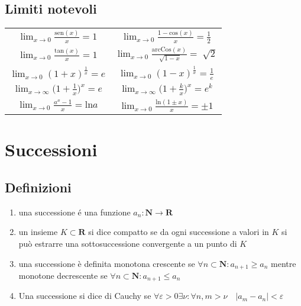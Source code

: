 \documentclass{exam}
\begin{document}
  \subsection{Limiti notevoli}
    \begin{center}
      \begin{tabular}{|c|c|}
        \(\displaystyle \lim_{x\to 0}\frac{\textrm{sen}(x)}{x}=1\)&
        \(\displaystyle \lim_{x\to 0}\frac{1-\textrm{cos}(x)}{x}=\frac{1}{2}\)\\
        \(\displaystyle \lim_{x\to 0}\frac{\textrm{tan}(x)}{x}=1\)&
        \(\displaystyle \lim_{x\to 0}\frac{\textrm{arcCos}(x)}{\sqrt[]{1-x}}=\sqrt[]{2}\)\\
        \(\displaystyle \lim_{x\to 0}(1+x)^\frac{1}{x}=e\)&
        \(\displaystyle \lim_{x\to 0}(1-x)^\frac{1}{x}=\frac{1}{e}\)\\
        \(\displaystyle \lim_{x\to \infty}\Big(1+\frac{1}{x}\Big)^x=e\)&
        \(\displaystyle \lim_{x\to \infty}\Big(1+\frac{k}{x}\Big)^x=e^k\)\\
        \(\displaystyle \lim_{x\to 0}\frac{a^x-1}{x}=\textrm{ln}{a}\)&
        \(\displaystyle \lim_{x\to 0}\frac{\textrm{ln}(1\pm x)}{x}=\pm 1\)\\
      \end{tabular}
    \end{center}
   \newpage





\section{Successioni}
  \subsection{Definizioni}
    \begin{enumerate}
      \item una successione \'e una funzione $a_{n}: \mathbf{N} \rightarrow \mathbf{R}$
      \item un insieme $K\subset \mathbf{R}$ si dice compatto se da ogni successione a valori in $K$
        si può estrarre una sottosuccessione convergente a un punto di $K$
      \item una successione è definita monotona crescente se $\forall n\subset \mathbf{N}:
        a_{n+1}\ge a_{n}$
        mentre monotone decrescente se $\forall n\subset \mathbf{N}: a_{n+1}\le a_{n}$ 
      \item Una successione si dice di Cauchy se $\forall \varepsilon>0 \exists \nu:
        \forall n,m>\nu \quad |a_{m}-a_{n}|<\varepsilon$  
     \end{enumerate}
  
\end{document}

